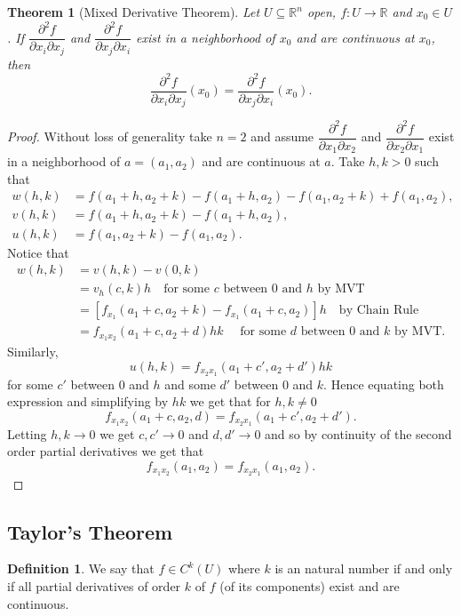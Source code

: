 \documentclass[11pt,openany]{book}
\theoremstyle{plain}
\newtheorem{theorem}{Theorem}[chapter]
\theoremstyle{definition}
\newtheorem{definition}{Definition}[chapter]
\theoremstyle{remark}
\newcommand{\R}{\mathbb{R}}
\begin{document}
\begin{theorem}[Mixed Derivative Theorem]
    Let $U \subseteq \R^n$ open, $f: U \to \R$ and $x_0 \in  U$. If $\dfrac{\partial^2 f}{\partial x_i \partial x_j}$ and $\dfrac{\partial^2 f}{\partial x_j \partial x_i}$ exist in a neighborhood of $x_0$ and are continuous at $x_0$, then \[\dfrac{\partial^2 f}{\partial x_i \partial x_j}(x_0) = \dfrac{\partial^2 f}{\partial x_j \partial x_i}(x_0).\]
\end{theorem}
\begin{proof}
    Without loss of generality take $n = 2$ and assume $\dfrac{\partial^2 f}{\partial x_1 \partial x_2}$ and $\dfrac{\partial^2 f}{\partial x_2 \partial x_1}$ exist in a neighborhood of $a = (a_1, a_2)$ and are continuous at $a$. Take $h, k > 0$ such that
    \begin{align*}
    w(h,k) &= f(a_1+h, a_2+k)-f(a_1+h, a_2)-f(a_1, a_2+k)+f(a_1, a_2),\\
    v(h,k) &= f(a_1+h,a_2+k)-f(a_1+h,a_2),\\
    u(h,k) &= f(a_1, a_2+k)-f(a_1, a_2).
    \end{align*}
    Notice that
    \begin{align*}
    w(h,k) &= v(h,k) - v(0,k)\\ 
    &= v_h(c,k)h \quad \text{for some  $c$ between $0$ and $h$ by MVT}\\
    &= [f_{x_1}(a_1+c,a_2+k)-f_{x_1}(a_1+c,a_2)]h \quad \text{by Chain Rule}\\
    &= f_{x_1x_2}(a_1+c, a_2+d)hk \quad \text{ for some $d$ between $0$ and $k$ by MVT.}
    \end{align*}
 Similarly,
    \[
    u(h,k) = f_{x_2x_1}(a_1+c', a_2+d')hk
    \]
    for some $c'$ between $0$ and $h$ and some $d'$ between $0$ and $k$. Hence equating both expression and simplifying by $hk$ we get that for $h,k\neq 0$
    \[f_{x_1x_2}(a_1+c,a_2,d) = f_{x_2x_1}(a_1+c',a_2+d').\]
    Letting $h,k \to 0$ we get $c, c' \to 0$ and $d, d' \to 0$ and so by continuity of the second order partial derivatives we get that
    $$f_{x_1x_2}(a_1,a_2)=f_{x_2x_1}(a_1,a_2).$$
\end{proof}


\subsection{Taylor's Theorem}



\begin{definition}
    We say that $f \in C^k(U)$ where $k$ is an natural number if and only if all partial derivatives of order $k$ of $f$ (of its components) exist and are continuous.
\end{definition}
\end{document}
